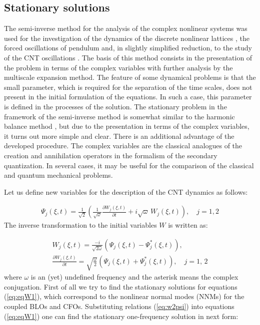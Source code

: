 \subsection{Stationary solutions}\label{Stat}
The semi-inverse method for the analysis of the complex nonlinear systems was used for the investigation of the dynamics of the discrete nonlinear lattices \cite{Kharkov2016,CAP2016,Smirnov2017}, the forced oscillations of pendulum \cite{CAP2016_2,Kharkov2016} and, in slightly simplified reduction, to the study of the CNT oscillations  \cite{Smirnov2014,Smirnov2016PhysD,IJNM2017}.
The basis of this method consists in the presentation of the problem in terms of the complex variables with further analysis by the multiscale expansion method.
The feature of some dynamical problems is that the small parameter, which is required for the separation of the time scales, does not present in the initial formulation of the equations.
In such a case, this parameter is defined in the processes of the solution.
The stationary problem in the framework of the semi-inverse method is somewhat similar to the harmonic balance method \cite{Mickens2010}, but due to the presentation in terms of the complex variables, it turns out more simple and clear.
There is an additional advantage of the developed procedure.
The complex variables are the classical analogues of the creation and annihilation operators in the formalism of the secondary quantization.
In several cases, it may be useful for the comparison of the  classical and quantum mechanical problems.

Let us define new variables for the description of the CNT dynamics as follows:

\begin{eqnarray}\label{eq:w2psi}
\Psi_{j}(\xi, t)=\frac{1}{\sqrt{2}} \left( \frac{1}{\sqrt{\omega}} \frac{\partial W_{j}(\xi, t)}{\partial t}+ i \sqrt{\omega} \,W_{j}(\xi, t) \right), \quad j=1,2
\end{eqnarray}
The inverse transformation to the initial variables $W$ is written as:

\begin{eqnarray}\label{eq:psi2w}
W_{j}(\xi, t)   =\frac{-i}{\sqrt{2 \omega}} \left( \Psi_{j}(\xi, t)-\Psi_{j}^{*}(\xi, t) \right),  \nonumber  \\
\frac{\partial W_{j}(\xi, t)}{\partial t}   =\sqrt{\frac{\omega}{2}} \left( \Psi_{j}(\xi, t)+\Psi_{j}^{*}(\xi, t) \right), \quad j=1,\,2
\end{eqnarray}
where $\omega$ is an (yet) undefined frequency and the asterisk means the complex conjugation.
First of all we try to find the stationary solutions for equations (\ref{eq:eqW1}), which  correspond to the nonlinear normal modes (NNMs) for the coupled BLOs and CFOs.
Substituting relations (\ref{eq:w2psi}) into equations (\ref{eq:eqW1}) one can find the stationary one-frequency solution in next form:

